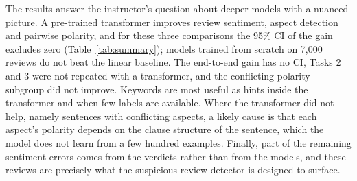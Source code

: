 The results answer the instructor's question about deeper models with a nuanced picture. A pre-trained transformer improves review sentiment, aspect detection and pairwise polarity, and for these three comparisons the 95\% CI of the gain excludes zero (Table~\ref{tab:summary}); models trained from scratch on 7,000 reviews do not beat the linear baseline. The end-to-end gain has no CI, Tasks 2 and 3 were not repeated with a transformer, and the conflicting-polarity subgroup did not improve. Keywords are most useful as hints inside the transformer and when few labels are available. Where the transformer did not help, namely sentences with conflicting aspects, a likely cause is that each aspect's polarity depends on the clause structure of the sentence, which the model does not learn from a few hundred examples. Finally, part of the remaining sentiment errors comes from the verdicts rather than from the models, and these reviews are precisely what the suspicious review detector is designed to surface.
